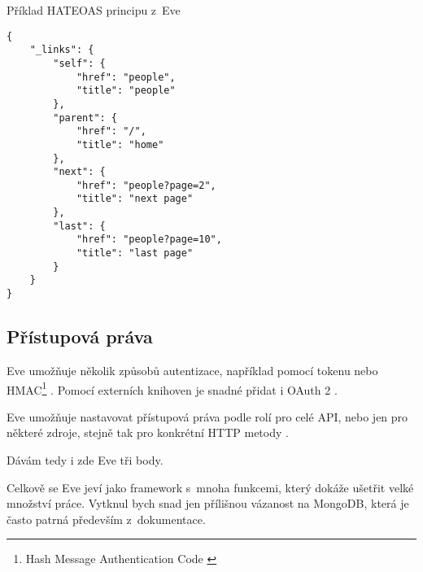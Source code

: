 \begin{listing}[htbp]
\caption{{\label{code:evehateoas}Příklad HATEOAS principu z~Eve \autocite{evehateoas}}}
\begin{verbatim}
{
    "_links": {
        "self": {
            "href": "people",
            "title": "people"
        },
        "parent": {
            "href": "/",
            "title": "home"
        },
        "next": {
            "href": "people?page=2",
            "title": "next page"
        },
        "last": {
            "href": "people?page=10",
            "title": "last page"
        }
    }
}
\end{verbatim}
\end{listing}

\subsection{Přístupová práva}\label{pux159uxedstupovuxe1-pruxe1va}

Eve umožňuje několik způsobů autentizace, například pomocí tokenu nebo HMAC\footnote{Hash Message Authentication Code \autocite{hmac}} \autocite{eveauth}. Pomocí externích knihoven je snadné přidat i OAuth 2 \autocite{eveoauth}.

Eve umožňuje nastavovat přístupová práva podle rolí pro celé API, nebo jen pro některé zdroje, stejně tak pro konkrétní HTTP metody \autocite{eveauth}.

Dávám tedy i zde Eve tři body.

Celkově se Eve jeví jako framework s~mnoha funkcemi, který dokáže ušetřit velké množství práce. Vytknul bych snad jen přílišnou vázanost na MongoDB, která je často patrná především z~dokumentace.
